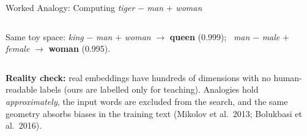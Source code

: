 \documentclass[aspectratio=169,10pt]{beamer}
\begin{document}
\begin{frame}{Worked Analogy: Computing \emph{tiger} $-$ \emph{man} $+$ \emph{woman}}
\begin{columns}[T]
\raggedright\vspace{2pt}
\begin{rbox}\scriptsize Same toy space: \emph{king} $-$ \emph{man} $+$ \emph{woman} $\to$ \textbf{queen} (0.999); \ \emph{man} $-$ \emph{male} $+$ \emph{female} $\to$ \textbf{woman} (0.995).\end{rbox}
\end{columns}
\begin{wbox}\scriptsize\textbf{Reality check:} real embeddings have hundreds of dimensions with no human-readable labels (ours are labelled only for teaching). Analogies hold \emph{approximately}, the input words are excluded from the search, and the same geometry absorbs biases in the training text (Mikolov et al.\ 2013; Bolukbasi et al.\ 2016).\end{wbox}
\end{frame}
\end{document}
